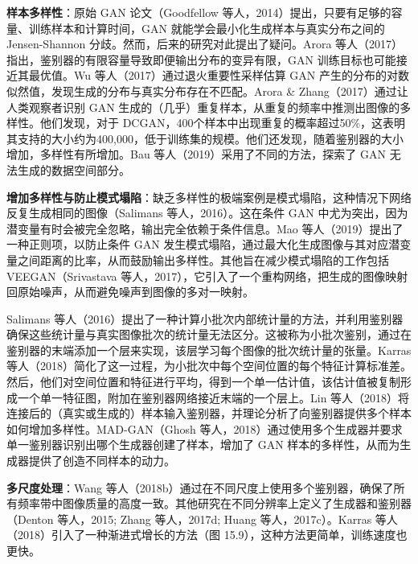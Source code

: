 \documentclass[lang=cn,newtx,10pt,scheme=chinese]{elegantbook}
\begin{document}
\textbf{样本多样性}：原始 GAN 论文（Goodfellow 等人，2014）提出，只要有足够的容量、训练样本和计算时间，GAN 就能学会最小化生成样本与真实分布之间的 Jensen-Shannon 分歧。然而，后来的研究对此提出了疑问。Arora 等人（2017）指出，鉴别器的有限容量导致即便输出分布的变异有限，GAN 训练目标也可能接近其最优值。Wu 等人（2017）通过退火重要性采样估算 GAN 产生的分布的对数似然值，发现生成的分布与真实分布存在不匹配。Arora \& Zhang（2017）通过让人类观察者识别 GAN 生成的（几乎）重复样本，从重复的频率中推测出图像的多样性。他们发现，对于 DCGAN，400个样本中出现重复的概率超过50\%，这表明其支持的大小约为400,000，低于训练集的规模。他们还发现，随着鉴别器的大小增加，多样性有所增加。Bau 等人（2019）采用了不同的方法，探索了 GAN 无法生成的数据空间部分。

\textbf{增加多样性与防止模式塌陷}：缺乏多样性的极端案例是模式塌陷，这种情况下网络反复生成相同的图像（Salimans 等人，2016）。这在条件 GAN 中尤为突出，因为潜变量有时会被完全忽略，输出完全依赖于条件信息。Mao 等人（2019）提出了一种正则项，以防止条件 GAN 发生模式塌陷，通过最大化生成图像与其对应潜变量之间距离的比率，从而鼓励输出多样性。其他旨在减少模式塌陷的工作包括 VEEGAN（Srivastava 等人，2017），它引入了一个重构网络，把生成的图像映射回原始噪声，从而避免噪声到图像的多对一映射。

Salimans 等人（2016）提出了一种计算小批次内部统计量的方法，并利用鉴别器确保这些统计量与真实图像批次的统计量无法区分。这被称为小批次鉴别，通过在鉴别器的末端添加一个层来实现，该层学习每个图像的批次统计量的张量。Karras 等人（2018）简化了这一过程，为小批次中每个空间位置的每个特征计算标准差。然后，他们对空间位置和特征进行平均，得到一个单一估计值，该估计值被复制形成一个单一特征图，附加在鉴别器网络接近末端的一个层上。Lin 等人（2018）将连接后的（真实或生成的）样本输入鉴别器，并理论分析了向鉴别器提供多个样本如何增加多样性。MAD-GAN（Ghosh 等人，2018）通过使用多个生成器并要求单一鉴别器识别出哪个生成器创建了样本，增加了 GAN 样本的多样性，从而为生成器提供了创造不同样本的动力。

\textbf{多尺度处理}：Wang 等人（2018b）通过在不同尺度上使用多个鉴别器，确保了所有频率带中图像质量的高度一致。其他研究在不同分辨率上定义了生成器和鉴别器（Denton 等人，2015; Zhang 等人，2017d; Huang 等人，2017c）。Karras 等人（2018）引入了一种渐进式增长的方法（图 15.9），这种方法更简单，训练速度也更快。
\end{document}
